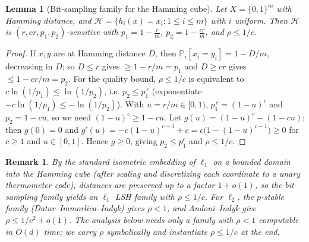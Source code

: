 \documentclass{amsart}
\newtheorem{lemma}{Lemma}
\newtheorem{remark}{Remark}
\renewcommand{\Pr}{\mathbb{P}}
\begin{document}
\begin{lemma}[Bit-sampling family for the Hamming cube]\label{lem:hamming}
Let $X=\{0,1\}^{m}$ with Hamming distance, and $\mathcal H=\{h_i(x)=x_i:1\le i\le m\}$
with $i$ uniform.  Then $\mathcal H$ is $(r,cr,p_1,p_2)$-sensitive with
$p_1=1-\frac{r}{m}$, $p_2=1-\frac{cr}{m}$, and $\rho\le 1/c$.
\end{lemma}
\begin{proof}
If $x,y$ are at Hamming distance $D$, then $\Pr_i[x_i=y_i]=1-D/m$, decreasing in $D$;
so $D\le r$ gives $\ge 1-r/m=p_1$ and $D\ge cr$ gives $\le 1-cr/m=p_2$.  For the
quality bound, $\rho\le 1/c$ is equivalent to $c\ln(1/p_1)\le\ln(1/p_2)$, i.e.
$p_2\le p_1^{\,c}$ (exponentiate $-c\ln(1/p_1)\le-\ln(1/p_2)$).  With $u=r/m\in[0,1)$,
$p_1^{\,c}=(1-u)^c$ and $p_2=1-cu$, so we need $(1-u)^c\ge 1-cu$.  Let
$g(u)=(1-u)^c-(1-cu)$; then $g(0)=0$ and $g'(u)=-c(1-u)^{c-1}+c
=c\big(1-(1-u)^{c-1}\big)\ge 0$ for $c\ge 1$ and $u\in[0,1]$.  Hence $g\ge 0$, giving
$p_2\le p_1^c$ and $\rho\le 1/c$.
\end{proof}

\begin{remark}
By the standard isometric embedding of $\ell_1$ on a bounded domain into the Hamming
cube (after scaling and discretizing each coordinate to a unary thermometer code),
distances are preserved up to a factor $1+o(1)$, so the bit-sampling family yields an
$\ell_1$ LSH family with $\rho\le 1/c$.  For $\ell_2$, the $p$-stable family
(Datar--Immorlica--Indyk) gives $\rho<1$, and Andoni--Indyk give $\rho\le
1/c^2+o(1)$.  The analysis below needs only a family with $\rho<1$ computable in $O(d)$
time; we carry $\rho$ symbolically and instantiate $\rho\le 1/c$ at the end.
\end{remark}
\end{document}

